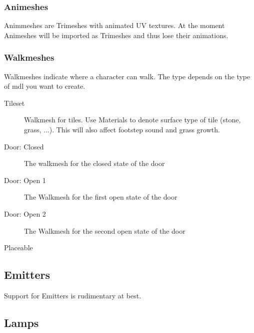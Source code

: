 \subsubsection{Animeshes}
Animmeshes are Trimeshes with animated UV textures. At the moment Animeshes
will be imported as Trimeshes and thus lose their animations.

\subsubsection{Walkmeshes}
Walkmeshes indicate where a character can walk. The type depends on the type
of mdl you want to create.
\begin{description}
    \item[Tileset] Walkmesh for tiles. Use Materials to denote surface type of
                   tile (stone, grass, ...). This will also affect footstep
                   sound and grass growth.
    \item[Door: Closed] The walkmesh for the closed state of the door
    \item[Door: Open 1] The Walkmesh for the first open state of the door
    \item[Door: Open 2] The Walkmesh for the second open state of the door
    \item[Placeable]
\end{description}

\subsection{Emitters}
Support for Emitters is rudimentary at best.

\subsection{Lamps}
